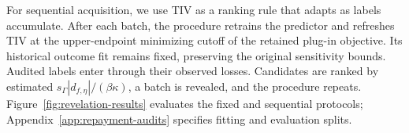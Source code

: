 For sequential acquisition, we use TIV as a ranking rule that adapts as labels accumulate. After each batch, the procedure retrains the predictor and refreshes TIV at the upper-endpoint minimizing cutoff of the retained plug-in objective. Its
historical outcome fit remains fixed, preserving the original sensitivity bounds. Audited labels
enter through their observed losses. Candidates are ranked by estimated
\(s_\Gamma|d_{f,\eta}|/(\beta\kappa)\), a batch is revealed, and the procedure repeats.
Figure~\ref{fig:revelation-results} evaluates the fixed and sequential protocols;
Appendix~\ref{app:repayment-audits} specifies fitting and evaluation splits.
